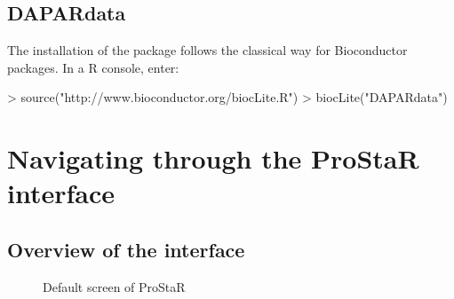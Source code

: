 \documentclass[12pt]{article}
\begin{document}
\subsection{DAPARdata}\label{sec:DAPARdata}

The installation of the package  follows 
the classical way for Bioconductor packages. In a R console, enter:
\begin{Schunk}
\begin{Sinput}
> source("http://www.bioconductor.org/biocLite.R")
> biocLite("DAPARdata")
\end{Sinput}
\end{Schunk}


\section{Navigating through the ProStaR interface}

\subsection{Overview of the interface}

\begin{figure}
\centering
{}
\caption{Default screen of ProStaR}\label{fig:vuegal}
\end{figure}
\end{document}
